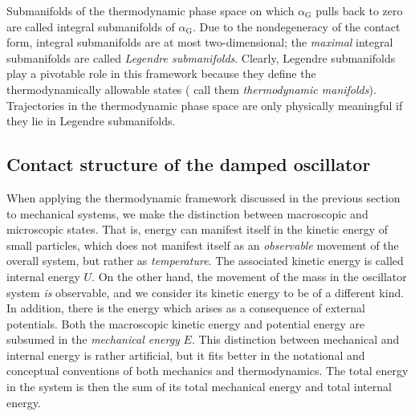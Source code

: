 Submanifolds of the thermodynamic phase space on which $\alpha_\text{G}$ pulls back to zero are called integral submanifolds of $\alpha_\text{G}$. Due to the nondegeneracy of the contact form, integral submanifolds are at most two-dimensional; the \emph{maximal} integral submanifolds are called \emph{Legendre submanifolds}. Clearly, Legendre submanifolds play a pivotable role in this framework because they define the thermodynamically allowable states (\citet{Balian2001} call them \emph{thermodynamic manifolds}). Trajectories in the thermodynamic phase space are only physically meaningful if they lie in Legendre submanifolds.

\subsection{Contact structure of the damped oscillator}
\label{ssec:thermo_dho}

When applying the thermodynamic framework discussed in the previous section to mechanical systems, we make the distinction between macroscopic and microscopic states. That is, energy can manifest itself in the kinetic energy of small particles, which does not manifest itself as an \emph{observable} movement of the overall system, but rather as \emph{temperature}. The associated kinetic energy is called internal energy $U$. On the other hand, the movement of the mass in the oscillator system \emph{is} observable, and we consider its kinetic energy to be of a different kind. In addition, there is the energy which arises as a consequence of external potentials. Both the macroscopic kinetic energy and potential energy are subsumed in the \emph{mechanical energy} $E$. This distinction between mechanical and internal energy is rather artificial, but it fits better in the notational and conceptual conventions of both mechanics and thermodynamics. The total energy in the system is then the sum of its total mechanical energy and total internal energy.

